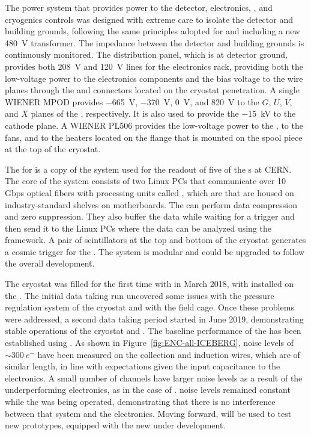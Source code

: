 The  power system that provides power to the detector, electronics, 
, and cryogenics controls was designed with extreme care to 
isolate the detector and building grounds, following the same principles adopted
for  and including a new \SI{480}{V} transformer. The impedance between the detector
and building grounds is continuously monitored. The distribution panel, which is 
at detector ground, provides both \SI{208}{V} and \SI{120}{V} lines for the  electronics rack, 
providing both the low-voltage power to the  electronics components and the bias 
voltage to the  wire planes through the  and 
connectors located on the cryostat penetration. A single WIENER MPOD provides 
\SI{-665}{V}, \SI{-370}{V}, \SI{0}{V}, and \SI{820}{V} to the $G$, $U$, $V$, and 
$X$ planes of the , respectively. It is also used to provide the 
\SI{-15}{kV} to the cathode plane. A WIENER PL506 provides the low-voltage
power to the , to the fans, and to the heaters located on the 
flange that is mounted on the spool piece at the top of the cryostat. 

The  for  is a copy of the system used for the readout
of five of the  s at CERN. The core of the  system 
consists of two Linux PCs that communicate over 10 Gbps optical fibers
with processing units called , which are  that are
housed on industry-standard  shelves on  motherboards.
The  can perform data compression and zero suppression. They also buffer
the data while waiting for a trigger and then send it to the Linux PCs where the data can
be analyzed using the  framework. A pair of scintillators at the top and
bottom of the cryostat generates a cosmic trigger for the .
The system is modular and could be upgraded to follow the overall    
development. 

The  cryostat was filled for the first time with 
in March 2018, with   installed on the . The
initial data taking run uncovered some issues with the pressure regulation system of
the cryostat and with the field cage. Once these problems were addressed, a second
data taking period started in June 2019, demonstrating stable operations of the
cryostat and . The baseline performance of the  
 has been established using  . 
As shown in Figure~\ref{fig:ENC-all-ICEBERG}, noise levels of 
$\sim\SI{300}{e^-}$ have been measured on the collection and induction wires,
which are of similar length, in line with expectations given the input capacitance
to the  electronics. A small number of channels have larger noise levels as a
result of the underperforming  electronics, as in the case of .
 noise levels remained constant while the  was
being operated, demonstrating that there is no interference between that system
and the  electronics. Moving forward,  will be used to
test new  prototypes, equipped with the new  under
development. 

